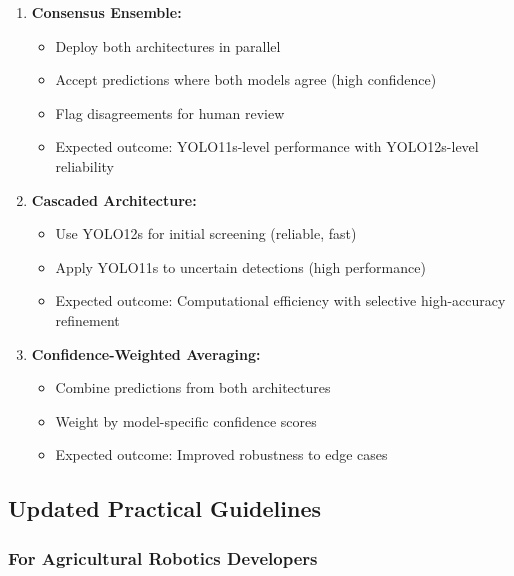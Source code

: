 \begin{enumerate}
    \item \textbf{Consensus Ensemble:}
    \begin{itemize}
        \item Deploy both architectures in parallel
        \item Accept predictions where both models agree (high confidence)
        \item Flag disagreements for human review
        \item Expected outcome: YOLO11s-level performance with YOLO12s-level reliability
    \end{itemize}
    
    \item \textbf{Cascaded Architecture:}
    \begin{itemize}
        \item Use YOLO12s for initial screening (reliable, fast)
        \item Apply YOLO11s to uncertain detections (high performance)
        \item Expected outcome: Computational efficiency with selective high-accuracy refinement
    \end{itemize}
    
    \item \textbf{Confidence-Weighted Averaging:}
    \begin{itemize}
        \item Combine predictions from both architectures
        \item Weight by model-specific confidence scores
        \item Expected outcome: Improved robustness to edge cases
    \end{itemize}
\end{enumerate}

\subsection{Updated Practical Guidelines}

\subsubsection{For Agricultural Robotics Developers}

